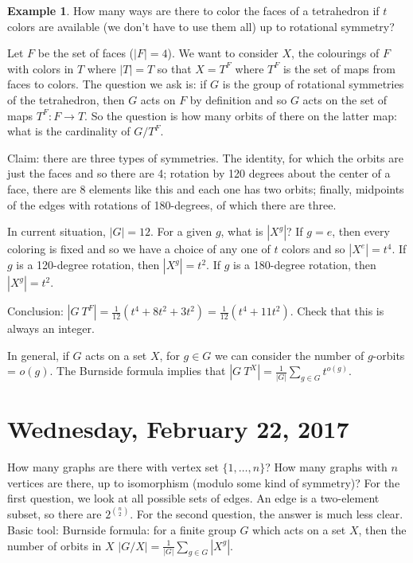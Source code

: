 \documentclass[12pt]{article}
\theoremstyle{definition}
\newtheorem{exmp}{Example}[section]
\begin{document}
\begin{exmp}
    How many ways are there to color the faces of a tetrahedron if $t$ colors
    are available (we don't have to use them all) up to rotational symmetry?

    Let $F$ be the set of faces ($|F| = 4$). We want to consider $X$, the
    colourings of $F$ with colors in $T$ where $|T| = T$ so that $X = T^F$
    where $T^F$ is the set of maps from faces to colors. The question we ask
    is: if $G$ is the group of rotational symmetries of the tetrahedron, then
    $G$ acts on $F$ by definition and so $G$ acts on the set of maps $T^F: F
    \rightarrow T$. So the question is how many orbits of there on the latter
    map: what is the cardinality of $G/T^F$.

    Claim: there are three types of symmetries. The identity, for which the
    orbits are just the faces and so there are 4; rotation by 120 degrees about
    the center of a face, there are 8 elements like this and each one has two
    orbits; finally, midpoints of the edges with rotations of 180-degrees, of
    which there are three.

    In current situation, $|G| = 12$. For a given $g$, what is $|X^g|$? If $g =
    e$, then every coloring is fixed and so we have a choice of any one of $t$
    colors and so $|X^e| = t^4$. If $g$ is a 120-degree rotation, then $|X^g| =
    t^2$. If $g$ is a 180-degree rotation, then $|X^g| = t^2$.

    Conclusion: $|G \ T^F| = \frac{1}{12} (t^4 + 8t^2 + 3t^2) = \frac{1}{12}
    (t^4 + 11t^2)$. Check that this is always an integer.
\end{exmp}

In general, if $G$ acts on a set $X$, for $g \in G$ we can consider the number
of $g$-orbits = $o(g)$. The Burnside formula implies that $|G \ T^X| =
\frac{1}{|G|} \sum_{g \in G} t^{o(g)}$.

\section{Wednesday, February 22, 2017}

How many graphs are there with vertex set $\{1, \ldots, n\}$? How many graphs
with $n$ vertices are there, up to isomorphism (modulo some kind of symmetry)?
For the first question, we look at all possible sets of edges. An edge is a
two-element subset, so there are $2^{n \choose 2}$. For the second question,
the answer is much less clear. Basic tool: Burnside formula: for a finite group
$G$ which acts on a set $X$, then the number of orbits in $X$ $|G/X| =
\frac{1}{|G|} \sum_{g \in G} |X^g|$.
\end{document}

